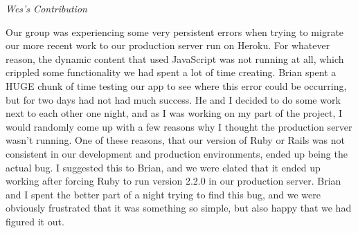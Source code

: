 \documentclass[11pt]{article}
\begin{document}
\textit{Wes's Contribution}

Our group was experiencing some very persistent errors when trying to migrate our more recent work to our production server run on Heroku.  For whatever reason, the dynamic content that used JavaScript was not running at all, which crippled some functionality we had spent a lot of time creating.  Brian spent a HUGE chunk of time testing our app to see where this error could be occurring, but for two days had not had much success.  He and I decided to do some work next to each other one night, and as I was working on my part of the project, I would randomly come up with a few reasons why I thought the production server wasn’t running.  One of these reasons, that our version of Ruby or Rails was not consistent in our development and production environments, ended up being the actual bug.  I suggested this to Brian, and we were elated that it ended up working after forcing Ruby to run version 2.2.0 in our production server.  Brian and I spent the better part of a night trying to find this bug, and we were obviously frustrated that it was something so simple, but also happy that we had figured it out.
\end{document}
